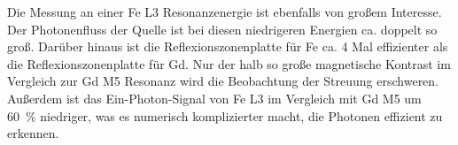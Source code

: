 \noindent
Die Messung an einer Fe L3 Resonanzenergie ist ebenfalls von großem Interesse. Der Photonenfluss der Quelle ist bei diesen niedrigeren Energien ca. doppelt so groß. Darüber hinaus ist die Reflexionszonenplatte für Fe ca. 4 Mal effizienter als die Reflexionszonenplatte für Gd. Nur der halb so große magnetische Kontrast im Vergleich zur Gd M5 Resonanz wird die Beobachtung der Streuung erschweren. Außerdem ist das Ein-Photon-Signal von Fe L3 im Vergleich mit Gd M5 um \SI{60}{\percent} niedriger, was es numerisch komplizierter macht, die Photonen effizient zu erkennen.  




%     



